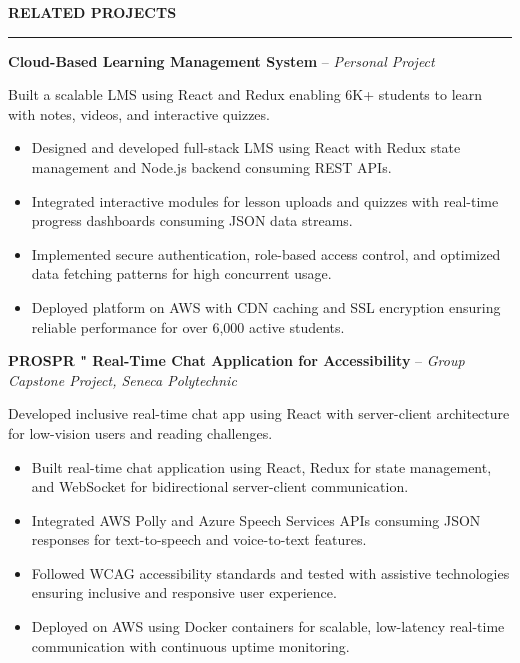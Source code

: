 \documentclass[10pt,letterpaper]{article}
\begin{document}
\vspace{6pt}

\textbf{RELATED PROJECTS}\\[-8pt]
\noindent\rule{\textwidth}{1pt}

\vspace{-2pt}

\textbf{Cloud-Based Learning Management System} -- \emph{Personal Project}

\vspace{-1pt}

Built a scalable LMS using React and Redux enabling 6K+ students to learn with notes, videos, and interactive quizzes.
\vspace{-1pt}
\begin{itemize}
\item Designed and developed full-stack LMS using React with Redux state management and Node.js backend consuming REST APIs.
\item Integrated interactive modules for lesson uploads and quizzes with real-time progress dashboards consuming JSON data streams.
\item Implemented secure authentication, role-based access control, and optimized data fetching patterns for high concurrent usage.
\item Deployed platform on AWS with CDN caching and SSL encryption ensuring reliable performance for over 6,000 active students.
\end{itemize}

\textbf{PROSPR " Real-Time Chat Application for Accessibility} -- \emph{Group Capstone Project, Seneca Polytechnic}

\vspace{-1pt}

Developed inclusive real-time chat app using React with server-client architecture for low-vision users and reading challenges.
\vspace{-1pt}
\begin{itemize}
\item Built real-time chat application using React, Redux for state management, and WebSocket for bidirectional server-client communication.
\item Integrated AWS Polly and Azure Speech Services APIs consuming JSON responses for text-to-speech and voice-to-text features.
\item Followed WCAG accessibility standards and tested with assistive technologies ensuring inclusive and responsive user experience.
\item Deployed on AWS using Docker containers for scalable, low-latency real-time communication with continuous uptime monitoring.
\end{itemize}
\end{document}
